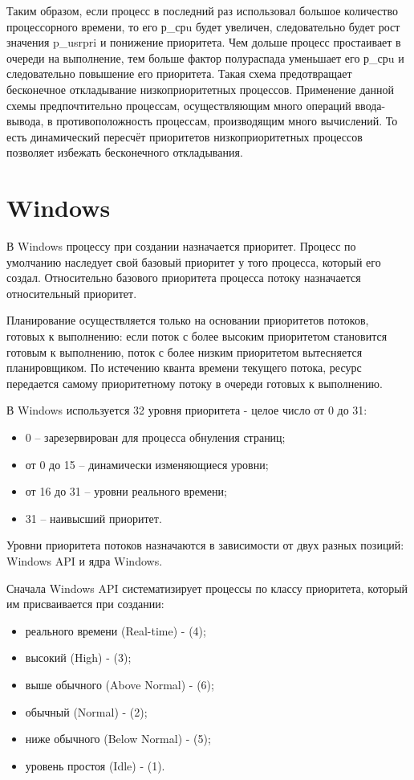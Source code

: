 Таким образом, если процесс в последний раз использовал большое количество процессорного времени, то его р\_срu будет увеличен, следовательно будет рост значения p\_usrpri и понижение приоритета.  Чем дольше процесс простаивает в очереди на выполнение, тем больше фактор полураспада уменьшает его р\_срu и следовательно повышение его приоритета. Такая схема предотвращает бесконечное откладывание низкоприоритетных процессов. Применение данной схемы предпочтительно процессам, осуществляющим много операций ввода-вывода, в противоположность процессам, производящим много вычислений. То есть динамический пересчёт приоритетов низкоприоритетных процессов позволяет избежать бесконечного откладывания.


\section{Windows}

В Windows процессу при создании назначается приоритет. Процесс по умолчанию наследует свой базовый приоритет у того процесса, который его создал. Относительно базового приоритета процесса потоку назначается относительный приоритет. 

Планирование осуществляется только на основании приоритетов потоков, готовых к выполнению: если поток с более высоким приоритетом становится готовым к выполнению, поток с более низким приоритетом вытесняется планировщиком. По истечению кванта времени текущего потока, ресурс передается самому приоритетному потоку в очереди готовых к выполнению.

В Windows используется 32 уровня приоритета - целое число от 0 до 31:
\begin{itemize}
	\item 0 -- зарезервирован для процесса обнуления страниц;
	\item от 0 до 15 -- динамически изменяющиеся уровни;
	\item от 16 до 31 -- уровни реального времени;
	\item 31 -- наивысший приоритет.
\end{itemize}

Уровни приоритета потоков назначаются в зависимости от двух разных позиций: Windows API и ядра Windows.

Сначала Windows API систематизирует процессы по классу приоритета, который им присваивается при создании:
\begin{itemize}
	\item реального времени (Real-time) - (4);
	\item высокий (High) - (3);
	\item выше обычного (Above Normal) - (6);
	\item обычный (Normal) - (2);
	\item ниже обычного (Below Normal) - (5);
	\item уровень простоя (Idle) - (1).
\end{itemize}

